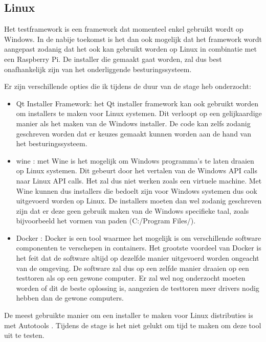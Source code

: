 \documentclass{article}
\begin{document}
\subsection{Linux}
Het testframework is een framework dat momenteel enkel gebruikt wordt op Windows.
In de nabije toekomst is het dan ook mogelijk dat het framework wordt aangepast zodanig dat het ook kan gebruikt worden op Linux in combinatie met een Raspberry Pi.
De installer die gemaakt gaat worden, zal dus best onafhankelijk zijn van het onderliggende besturingssysteem.

Er zijn verschillende opties die ik tijdens de duur van de stage heb onderzocht:
\begin{itemize}

\item Qt Installer Framework: het Qt installer framework kan ook gebruikt worden om installers te maken voor Linux systemen.
Dit verloopt op een gelijkaardige manier als het maken van de Windows installer.
De code kan zelfs zodanig geschreven worden dat er keuzes gemaakt kunnen worden aan de hand van het besturingssysteem. 

\item wine \citep{wineMain}: met Wine is het mogelijk om Windows programma's te laten draaien op Linux systemen.
Dit gebeurt door het vertalen van de Windows API calls naar Linux API calls.
Het zal dus niet werken zoals een virtuele machine.
Met Wine kunnen dus installers die bedoelt zijn voor Windows systemen dus ook uitgevoerd worden op Linux.
De installers moeten dan wel zodanig geschreven zijn dat er deze geen gebruik maken van de Windows specifieke taal, zoals bijvoorbeeld het vormen van paden (C:/Program Files/).

\item Docker \citep{dockerMain}: Docker is een tool waarmee het mogelijk is om verschillende software componenten te verschepen in containers.
Het grootste voordeel van Docker is het feit dat de software altijd op dezelfde manier uitgevoerd worden ongeacht van de omgeving.
De software zal dus op een zelfde manier draaien op een testtoren als op een gewone computer.
Er zal wel nog onderzocht moeten worden of dit de beste oplossing is, aangezien de testtoren meer drivers nodig hebben dan de gewone computers.

\end{itemize}
De meest gebruikte manier om een installer te maken voor Linux distributies is met Autotools \citep{autoMain}.
Tijdens de stage is het niet gelukt om tijd te maken om deze tool uit te testen.
\end{document}
